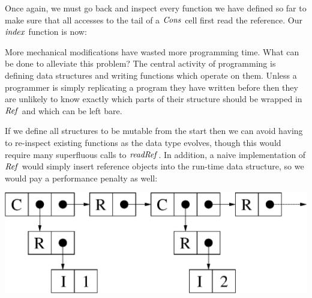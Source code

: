 
Once again, we must go back and inspect every function we have defined so far to make sure that all accesses to the tail of a $\operatorname{\mathit{Cons}}$ cell first read the reference. Our $\operatorname{\mathit{index}}$ function is now:


More mechanical modifications have wasted more programming time. What can be done to alleviate this problem? The central activity of programming is defining data structures and writing functions which operate on them. Unless a programmer is simply replicating a program they have written before then they are unlikely to know exactly which parts of their structure should be wrapped in $\operatorname{\mathit{Ref}}$ and which can be left bare.

If we define all structures to be mutable from the start then we can avoid having to re-inspect existing functions as the data type evolves, though this would require many superfluous calls to $\operatorname{\mathit{readRef}}$. In addition, a naive implementation of $\operatorname{\mathit{Ref}}$ would simply insert reference objects into the run-time data structure, so we would pay a performance penalty as well:

\begin{center}
\includegraphics[scale=0.5]{1-Introduction/fig/ref-types/ref-list}
\end{center}

